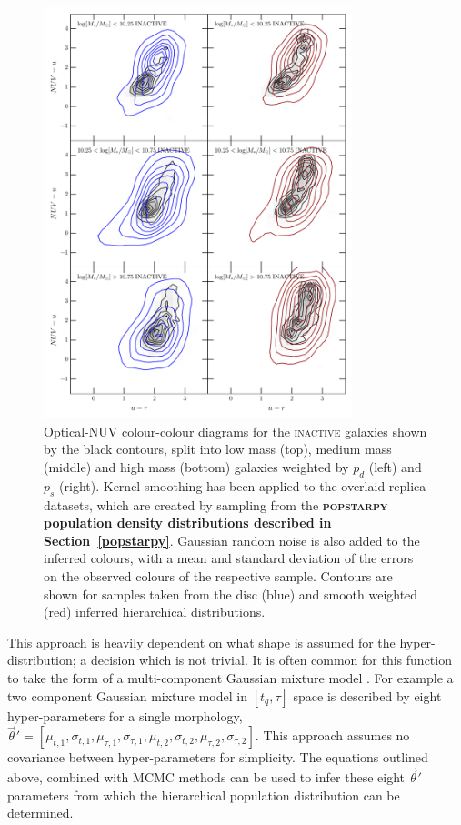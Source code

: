 \begin{figure}
\begin{centering}
\includegraphics[width=0.8\textwidth]{starpy/figc3b.pdf}
\caption[Replica colour-colour distributions using the \textsc{popstarpy} method]{Optical-NUV colour-colour diagrams for the \textsc{inactive} galaxies shown by the black contours, split into low mass (top), medium mass (middle) and high mass (bottom) galaxies weighted by $p_d$ (left) and $p_s$ (right). Kernel smoothing has been applied to the overlaid replica datasets, which are created by sampling from the \textbf{\textsc{popstarpy} population density distributions described in Section~\ref{popstarpy}}. Gaussian random noise is also added to the inferred colours, with a mean and standard deviation of the errors on the observed colours of the respective sample. Contours are shown for samples taken from the disc (blue) and smooth weighted (red) inferred hierarchical distributions.}
\label{replicapop}
\end{centering}
\end{figure}

This approach is heavily dependent on what shape is assumed for the hyper-distribution; a decision which is not trivial. It is often common for this function to take the form of a multi-component Gaussian mixture model \citep{mackay03, lahav00}. For example a two component Gaussian mixture model in $[t_q, \tau]$ space is described by eight hyper-parameters for a single morphology, $\vec{\theta}' = [\mu_{t,1}, \sigma_{t,1}, \mu_{\tau,1}, \sigma_{\tau,1}, \mu_{t,2}, \sigma_{t,2}, \mu_{\tau,2}, \sigma_{\tau,2}]$. This approach assumes no covariance between hyper-parameters for simplicity. The equations outlined above, combined with MCMC methods can be used to infer these eight $\vec{\theta}'$ parameters from which the hierarchical population distribution can be determined. 

